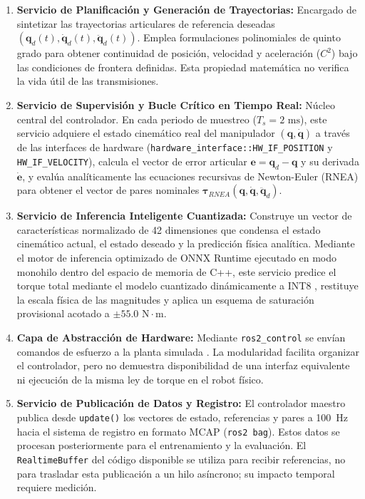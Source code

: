 \documentclass[12pt]{article}
\begin{document}
\begin{enumerate}
    \item \textbf{Servicio de Planificación y Generación de Trayectorias:} Encargado de sintetizar las trayectorias articulares de referencia deseadas $(\bm{q}_d(t), \dot{\bm{q}}_d(t), \ddot{\bm{q}}_d(t))$. Emplea formulaciones polinomiales de quinto grado \cite{biagiotti2008trajectory} para obtener continuidad de posición, velocidad y aceleración ($C^2$) bajo las condiciones de frontera definidas. Esta propiedad matemática no verifica la vida útil de las transmisiones.
    \item \textbf{Servicio de Supervisión y Bucle Crítico en Tiempo Real:} Núcleo central del controlador. En cada periodo de muestreo ($T_s = 2\text{ ms}$), este servicio adquiere el estado cinemático real del manipulador $(\bm{q}, \dot{\bm{q}})$ a través de las interfaces de hardware (\texttt{hardware\_interface::HW\_IF\_POSITION} y \texttt{HW\_IF\_VELOCITY}), calcula el vector de error articular $\bm{e} = \bm{q}_d - \bm{q}$ y su derivada $\dot{\bm{e}}$, y evalúa analíticamente las ecuaciones recursivas de Newton-Euler (RNEA) \cite{luh1980online} para obtener el vector de pares nominales $\bm{\tau}_{RNEA}(\bm{q}, \dot{\bm{q}}, \ddot{\bm{q}}_d)$.
    \item \textbf{Servicio de Inferencia Inteligente Cuantizada:} Construye un vector de características normalizado de 42 dimensiones que condensa el estado cinemático actual, el estado deseado y la predicción física analítica. Mediante el motor de inferencia optimizado de ONNX Runtime ejecutado en modo monohilo dentro del espacio de memoria de C++, este servicio predice el torque total mediante el modelo cuantizado dinámicamente a INT8 \cite{jacob2018quantization}, restituye la escala física de las magnitudes y aplica un esquema de saturación provisional acotado a $\pm 55.0\text{ N}\cdot\text{m}$.
    \item \textbf{Capa de Abstracción de Hardware:} Mediante \texttt{ros2\_control} se envían comandos de esfuerzo a la planta simulada \cite{macenski2022robot}. La modularidad facilita organizar el controlador, pero no demuestra disponibilidad de una interfaz equivalente ni ejecución de la misma ley de torque en el robot físico.
    \item \textbf{Servicio de Publicación de Datos y Registro:} El controlador maestro publica desde \texttt{update()} los vectores de estado, referencias y pares a 100~Hz hacia el sistema de registro en formato MCAP (\texttt{ros2 bag}). Estos datos se procesan posteriormente para el entrenamiento y la evaluación. El \texttt{RealtimeBuffer} del código disponible se utiliza para recibir referencias, no para trasladar esta publicación a un hilo asíncrono; su impacto temporal requiere medición.
\end{enumerate}
\end{document}
